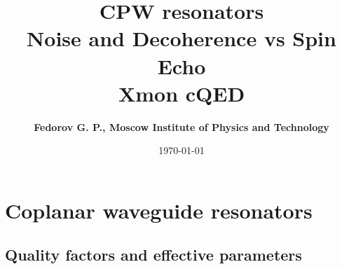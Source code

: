 \documentclass[aspectratio=169, 13pt]{beamer}
\title{CPW resonators\\Noise and Decoherence vs Spin Echo\\Xmon cQED}
\author{\bf Fedorov G. P.\normalfont, Moscow Institute of Physics and Technology}
\date{\today}
\begin{document}
  
{
\begin{frame}[plain]
  \titlepage
\end{frame}
}




\section{Coplanar waveguide resonators}
\frame[plain]{
	\tableofcontents[currentsection]
}
\addtocounter{page}{-1}

\AtBeginSection[]
{
  \begin{frame}[plain]
    \tableofcontents[currentsection]
    \addtocounter{page}{-1}
  \end{frame}
}
\subsection{Quality factors and effective parameters}
\end{document}
